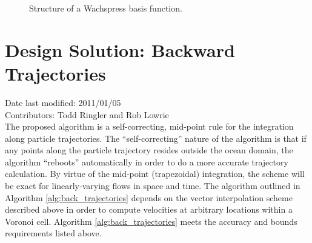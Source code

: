 \documentclass[11pt]{report}
\begin{document}
\begin{figure}
  \caption{Structure of a Wachspress basis function.}
  \label{fig:Basis}
\end{figure} 


\section{Design Solution: Backward Trajectories}
Date last modified: 2011/01/05 \\
Contributors: Todd Ringler and Rob Lowrie \\

The proposed algorithm is a self-correcting, mid-point rule for the integration along particle trajectories. The ``self-correcting''  nature of the algorithm is that if any points along the particle trajectory resides outside the ocean domain, the algorithm ``reboots'' automatically in order to do a more accurate trajectory calculation. By virtue of the mid-point (trapezoidal) integration, the scheme will be exact for linearly-varying flows in space and time. The algorithm outlined in Algorithm \ref{alg:back_trajectories} depends on the vector interpolation scheme described above in order to compute velocities at arbitrary locations within a Voronoi cell. Algorithm \ref{alg:back_trajectories} meets the accuracy and bounds requirements listed above.
\end{document}

